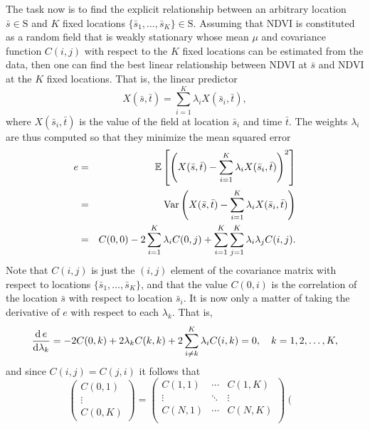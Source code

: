 {The task now is to find the explicit relationship between an arbitrary location $\bar{s}\in \mbox{S}$ and $K$ fixed locations $\{\bar{s}_1,\ldots,\bar{s}_K\}\in\mbox{S}$.  Assuming that NDVI  is constituted as a random field that is weakly stationary whose mean $\mu$ and covariance function $C(i,j)$ with respect to the $K$ fixed locations can be estimated from the data, then one can find the best linear relationship between NDVI at $\bar{s}$ and NDVI at the $K$ fixed locations. That is,  the linear predictor   
\begin{equation}
X(\bar{s},\bar{t}) = \sum_{i=1}^K \lambda_i X(\bar{s}_i,\bar{t}),
\end{equation}
where $X(\bar{s}_i,\bar{t})$ is the value of the  field at location $\bar{s}_i$ and time $\bar{t}$. The weights $\lambda_i$ are thus computed so that they minimize the mean squared 
error 
\begin{eqnarray} 
e & =& \mathbb{E}\left[\left(X(\bar{s},\bar{t}) - \sum_{i=1}^K \lambda_i  X(\bar{s}_i,\bar{t})\right)^2\right] \\
& =& {\rm{Var}}\left(X(\bar{s},\bar{t}) - \sum_{i=1}^K \lambda_i X(\bar{s}_i,\bar{t}) \right) \\
& =& C(0,0)-2 \sum_{i=1}^K \lambda_i C(0,j) + \sum_{i=1}^K\sum_{j=1}^K \label{eq:min_MSE_kriging}
\lambda_i \lambda_j C(i,j).
\end{eqnarray}
Note that $C(i,j)$ is just the $(i,j)$ element of the covariance matrix with respect to locations $\{\bar{s}_1,\ldots,\bar{s}_K\}$, and 
that the value $C(0,i)$ is the correlation of the location $\bar{s}$ with respect to location $\bar{s}_i$. It is now only a matter of taking the derivative of $e$ with respect to each $\lambda_k$. That is,
\begin{equation}
 \frac{{\rm{d}} \,e}{{\rm{d}} \lambda_k} = -2 C(0,k) +2\lambda_k C(k,k) + 2 \sum_{i\neq k}^K
\lambda_i C(i,k) = 0,\quad   k=1,2, \ldots,K,
\end{equation}
and since $C(i,j)=C(j,i)$ it follows that
\begin{equation} \label{eq:covariance_equation}
\left(\begin{array}{c} C(0,1)\\ \vdots \\ C(0,K) 
\end{array}\right) = \left(\begin{array}{ccc} 
C(1,1) & \cdots & C(1,K) \\ \vdots & \ddots & \vdots \\ C(N,1) & \cdots & C(N,K) 
\\ \end{array}\right) \left(\begin{array}{c} 

\end{array}
\end{equation}}
